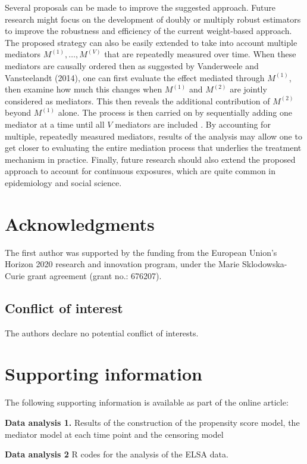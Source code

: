 \documentclass[AMA,STIX1COL]{WileyNJD-v2}
\begin{document}
Several proposals can be made to improve the suggested approach. Future research might focus on the development of doubly or multiply robust estimators \citep{bang2005doubly} to improve the robustness and efficiency of the current weight-based approach. The proposed strategy can also be easily extended to take into account multiple mediators $M^{(1)}, \ldots, M^{(V)}$ that are repeatedly measured over time. When these mediators are causally ordered then as suggested by Vanderweele and Vansteelandt (2014), one can first evaluate the effect mediated through $M^{(1)}$, then examine how much this changes when $M^{(1)}$ and $M^{(2)}$ are jointly considered as mediators. This then reveals the additional contribution of $M^{(2)}$ beyond $M^{(1)}$ alone. The process is then carried on by sequentially adding one mediator at a time until all $V$ mediators are included \citep{vdw14}. By accounting for multiple, repeatedly measured mediators, results of the analysis may allow one to get closer to evaluating the entire mediation process that underlies the treatment mechanism in practice. Finally, future research should also extend the proposed approach to account for continuous exposures, which are quite common in epidemiology and social science.


\section*{Acknowledgments}
The first author was supported by the funding from the European Union’s Horizon 2020 research and innovation program, under the Marie Sklodowska-Curie grant agreement (grant no.: 676207).

\subsection*{Conflict of interest}
The authors declare no potential conflict of interests.


\section*{Supporting information}
The following supporting information is available as part of the online article:

\noindent
\textbf{Data analysis 1.}
{Results of the construction of the propensity score model, the mediator model at each time point and the censoring model}

\noindent
\textbf{Data analysis 2}
{R codes for the analysis of the ELSA data.}
\end{document}
